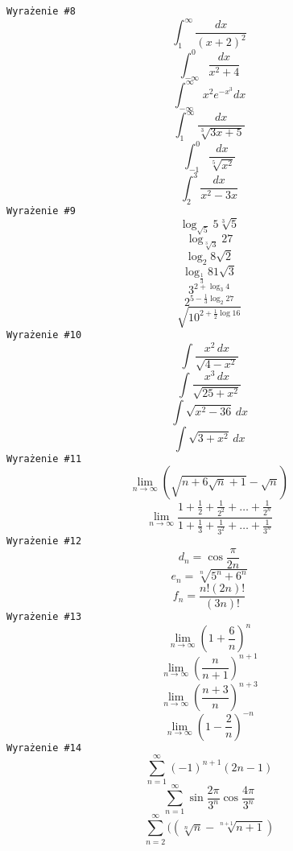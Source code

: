 \documentclass[12pt]{article}
\begin{document}
\texttt{Wyrażenie \#8}
$$
\int_1^{\infty} \frac{dx}{(x+2)^2}
$$
$$
\int_{-\infty}^0 \frac{dx}{x^2+4}
$$
$$
\int_{-\infty}^{\infty} x^2e^{-x^3} dx
$$
$$
\int_1^{\infty} \frac{dx}{\sqrt[3]{3x+5}}
$$
$$
\int_{-1}^0 \frac{dx}{\sqrt[5]{x^2}}
$$
$$
\int_2^3 \frac{dx}{x^2-3x} 
$$
\texttt{Wyrażenie \#9}
$$\log_{\sqrt{5}} 5\sqrt[3]{5}$$
$$\log_{\sqrt[3]{3}} 27$$
$$\log_2 8\sqrt{2}$$
$$\log_{\frac{1}{3}}81\sqrt{3}$$
$$3^{2+\log_3 4}$$
$$2^{5-\frac{1}{3}\log _2 27}$$
$$\sqrt{10^{2+\frac{1}{2}\log 16}}$$
\texttt{Wyrażenie \#10}
$$
\int \frac{x^2 \, dx}{\sqrt{4-x^2}}
$$
$$
\int \frac{x^3 \, dx}{\sqrt{25+x^2}}
$$
$$
\int \sqrt{x^2-36}\, dx
$$
$$
\int \sqrt{3+x^2}\, dx
$$
\texttt{Wyrażenie \#11}
$$
\lim_{n\to\infty} 
\left( 
\sqrt{n+6\sqrt{n}+1}-\sqrt{n}
\right)
$$
$$
\lim_{n\to\infty}
\frac
{1+\frac{1}{2}+\frac{1}{2^2}+\ldots+\frac{1}{2^n}}
{1+\frac{1}{3}+\frac{1}{3^2}+\ldots+\frac{1}{3^n}}
$$
\texttt{Wyrażenie \#12}
$$
d_n=\cos \frac{\pi}{2n}
$$
$$
e_n=\sqrt[n]{5^n+6^n}
$$
$$
f_n=\frac{n!(2n)!}{(3n)!}
$$
\texttt{Wyrażenie \#13}
$$
\lim_{n\to\infty} \left(1+\frac{6}{n}\right)^n
$$
$$
\lim_{n\to\infty} \left(\frac{n}{n+1}\right)^{n+1}
$$
$$
\lim_{n\to\infty} \left(\frac{n+3}{n}\right)^{n+3}
$$
$$
\lim_{n\to\infty} \left(1-\frac{2}{n}\right)^{-n}
$$
\texttt{Wyrażenie \#14}
$$
\sum_{n=1}^{\infty} (-1)^{n+1}(2n-1)
$$
$$
\sum_{n=1}^{\infty} \sin\frac{2\pi}{3^n}\cos\frac{4\pi}{3^n}
$$
$$
\sum_{n=2}^{\infty} (\left(\sqrt[n]{n} - \sqrt[n+1]{n+1} \right)
$$
\end{document}
